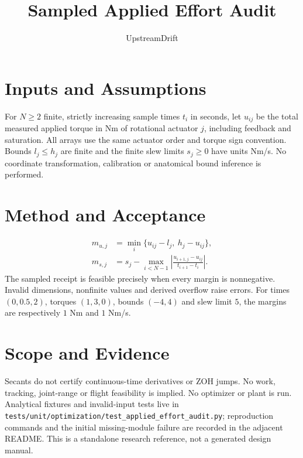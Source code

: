 \documentclass{article}
\begin{document}
\title{Sampled Applied Effort Audit}
\author{UpstreamDrift}
\maketitle
\section{Inputs and Assumptions}
For $N\geq2$ finite, strictly increasing sample times $t_i$ in seconds,
let $u_{ij}$ be the total measured applied torque in Nm of rotational actuator
$j$, including feedback and saturation. All arrays use the same actuator order
and torque sign convention. Bounds $l_j\leq h_j$ are finite and the finite
slew limits $s_j\geq0$ have units Nm/s. No coordinate transformation,
calibration or anatomical bound inference is performed.
\section{Method and Acceptance}
\begin{align*}
m_{u,j} &= \min_i\{u_{ij}-l_j,\ h_j-u_{ij}\},\\
m_{s,j} &= s_j-\max_{i<N-1}
  \left|\frac{u_{i+1,j}-u_{ij}}{t_{i+1}-t_i}\right|.
\end{align*}
The sampled receipt is feasible precisely when every margin is nonnegative.
Invalid dimensions, nonfinite values and derived overflow raise errors.
For times $(0,0.5,2)$, torques $(1,3,0)$, bounds $(-4,4)$ and slew
limit $5$, the margins are respectively $1$ Nm and $1$ Nm/s.
\section{Scope and Evidence}
Secants do not certify continuous-time derivatives or ZOH jumps. No work,
tracking, joint-range or flight feasibility is implied. No optimizer or plant
is run. Analytical fixtures and invalid-input tests live in
\texttt{tests/unit/optimization/test\_applied\_effort\_audit.py}; reproduction
commands and the initial missing-module failure are recorded in the adjacent
README. This is a standalone research reference, not a generated design manual.
\end{document}
